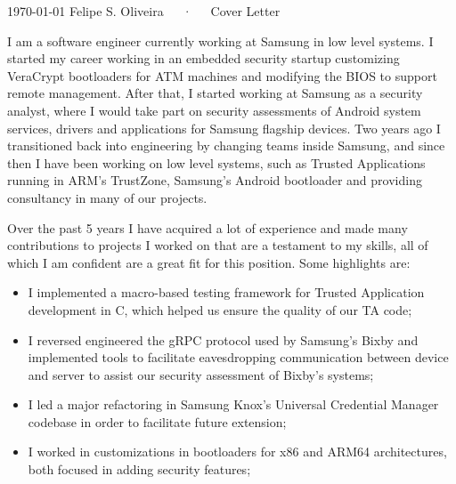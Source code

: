 \documentclass[11pt, a4paper]{awesome-cv}
\begin{document}
\makecvheader[R]

\makecvfooter
  {\today}
  {Felipe S. Oliveira~~~·~~~Cover Letter}
  {}

\makelettertitle

\begin{cvletter}

I am a software engineer currently working at Samsung in low level systems. I started my career working in an embedded security startup customizing VeraCrypt bootloaders for ATM machines and modifying the BIOS to support remote management. After that, I started working at Samsung as a security analyst, where I would take part on security assessments of Android system services, drivers and applications for Samsung flagship devices. Two years ago I transitioned back into engineering by changing teams inside Samsung, and since then I have been working on low level systems, such as Trusted Applications running in ARM's TrustZone, Samsung's Android bootloader and providing consultancy in many of our projects.

Over the past 5 years I have acquired a lot of experience and made many contributions to projects I worked on that are a testament to my skills, all of which I am confident are a great fit for this position. Some highlights are: 
\begin{itemize}
  \item I implemented a macro-based testing framework for Trusted Application development in C, which helped us ensure the quality of our TA code; 
  \item I reversed engineered the gRPC protocol used by Samsung's Bixby and implemented tools to facilitate eavesdropping communication between device and server to assist our security assessment of Bixby's systems; 
  \item I led a major refactoring in Samsung Knox's Universal Credential Manager codebase in order to facilitate future extension; 
  \item I worked in customizations in bootloaders for x86 and ARM64 architectures, both focused in adding security features;
\end{itemize}


\end{cvletter}
\end{document}
